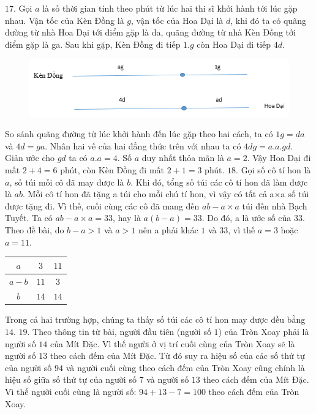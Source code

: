 $17.$ Gọi $a$ là số thời gian tính theo phút từ lúc hai thi sĩ khởi hành tới lúc gặp nhau. Vận tốc của Kèn Đồng là $g$, vận tốc của Hoa Dại là $d$, khi đó ta có quãng đường từ nhà Hoa Dại tới điểm gặp là da, quãng đường từ nhà Kèn Đồng tới điểm gặp là ga. Sau khi gặp, Kèn Đồng đi tiếp $1.g$ còn Hoa Dại đi tiếp $4d$.
\begin{figure}[H]
	\centering
	\vspace*{-5pt}
	\captionsetup{labelformat= empty, justification=centering}
	\includegraphics[width=1\linewidth]{13}
	\vspace*{-15pt}
\end{figure}
So sánh quãng đường từ lúc khởi hành đến lúc gặp theo hai cách, ta có $1g = da$ và $4d=ga$.
\vskip 0.1cm
Nhân hai vế của hai đẳng thức trên với nhau ta có $4dg= a.a.gd$. Giản ước cho $gd$ ta có  $a.a=4$. Số $a$ duy nhất thỏa mãn là $a=2$. Vậy Hoa Dại đi mất $2+4 = 6$ phút, còn Kèn Đồng đi mất $2+1 = 3$ phút.
\vskip 0.1cm
$18.$ Gọi số cô tí hon là $a$, số túi mỗi cô đã may được là $b$. Khi đó, tổng số túi các cô tí hon đã làm được là $ab$. Mỗi cô tí hon đã tặng a túi cho mỗi chú tí hon, vì vậy có tất cả a×a số túi được tặng đi. Vì thế, cuối cùng các cô đã mang đến $ab - a\times a$ túi đến nhà Bạch Tuyết.
\vskip 0.1cm
Ta có $ab - a\times a =33$, hay là $a(b-a) = 33$. Do đó, a là ước số của $33$. Theo đề bài, do $b - a > 1$ và $a>1$ nên a phải khác $1$ và $33$, vì thế $a=3$ hoặc $a= 11$.
\begin{table}[H]
	\centering
	\renewcommand{\arraystretch}{1.3}
	\begin{tabular}{|c|c|c|}
		\hline
		$a$ & $3$ & $11$\\
		\hline
		$a-b$& $11$ & $3$\\
		\hline
		$b$ & $14$ & $14$\\
		\hline
	\end{tabular}
\end{table}
Trong cả hai trường hợp, chúng ta thấy số túi các cô tí hon may được đều bằng $14$.
\vskip 0.1cm
$19$.
Theo thông tin từ bài, người đầu tiên (người số $1$) của Tròn Xoay phải là người số $14$ của Mít Đặc. Vì thế người ở vị trí cuối cùng của Tròn Xoay sẽ là người số $13$ theo cách đếm của Mít Đặc. Từ đó suy ra hiệu số của các số thứ tự của người số $94$ và người cuối cùng theo cách đếm của Tròn Xoay cũng chính là hiệu số giữa số thứ tự của người số $7$ và người số $13$  theo cách đếm của Mít Đặc. Vì thế người cuối cùng là người số: $94+ 13-7=100$ theo cách đếm của Tròn Xoay.
